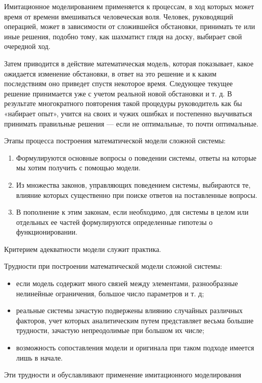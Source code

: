 Имитационное моделированием применяется к процессам, в ход которых может время от времени вмешиваться человеческая воля. Человек, руководящий операцией, может в зависимости от сложившейся обстановки, принимать те или иные решения, подобно тому, как шахматист глядя на доску, выбирает свой очередной ход. 

Затем приводится в действие математическая модель, которая показывает, какое ожидается изменение обстановки, в ответ на это решение и к каким последствиям оно приведет спустя некоторое время. Следующее текущее решение принимается уже с учетом реальной новой обстановки и т. д. В результате многократного повторения такой процедуры руководитель как бы «набирает опыт», учится на своих и чужих ошибках и постепенно выучиваться принимать правильные решения --- если не оптимальные, то почти оптимальные.

Этапы процесса построения математической модели сложной системы:

\begin{enumerate}
    \item Формулируются основные вопросы о поведении системы, ответы на которые мы хотим получить с помощью модели. 
    \item Из множества законов, управляющих поведением системы, выбираются те, влияние которых существенно при поиске ответов на поставленные вопросы.
    \item В пополнение к этим законам, если необходимо, для системы в целом или отдельных ее частей формулируются определенные гипотезы о функционировании.
\end{enumerate}

Критерием адекватности модели служит практика.

Трудности при построении математической модели сложной системы:

\begin{itemize}
    \item если модель содержит много связей между элементами, разнообразные нелинейные ограничения, большое число параметров и т. д;
    \item реальные системы зачастую подвержены влиянию случайных различных факторов, учет которых аналитическим путем представляет весьма большие трудности, зачастую непреодолимые при большом их числе;
    \item возможность сопоставления модели и оригинала при таком подходе имеется лишь в начале.
\end{itemize}

Эти трудности и обуславливают применение имитационного моделирования 

